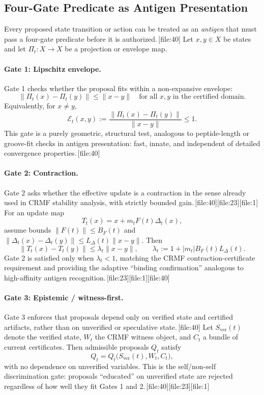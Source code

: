 \documentclass[11pt]{article}
\begin{document}
\subsection*{Four-Gate Predicate as Antigen Presentation}

Every proposed state transition or action can be treated as an \emph{antigen} that must pass a four-gate predicate before it is authorized.\,[file:40]
Let \(x,y\in X\) be states and let \(\Pi_t:X\to X\) be a projection or envelope map.

\paragraph{Gate 1: Lipschitz envelope.}

Gate 1 checks whether the proposal fits within a non-expansive envelope:
\[
\|\Pi_t(x)-\Pi_t(y)\| \le \|x-y\|\quad\text{for all }x,y\text{ in the certified domain.}
\]
Equivalently, for \(x\ne y\),
\[
\mathcal{E}_t(x,y) := \frac{\|\Pi_t(x)-\Pi_t(y)\|}{\|x-y\|} \le 1.
\]
This gate is a purely geometric, structural test, analogous to peptide-length or groove-fit checks in antigen presentation: fast, innate, and independent of detailed convergence properties.\,[file:40]

\paragraph{Gate 2: Contraction.}

Gate 2 asks whether the effective update is a contraction in the sense already used in CRMF stability analysis, with strictly bounded gain.\,[file:40][file:23][file:1]
For an update map
\[
T_t(x) = x + m_t F(t)\Delta_t(x),
\]
assume bounds \(\|F(t)\|\le B_F(t)\) and \(\|\Delta_t(x)-\Delta_t(y)\|\le L_\Delta(t)\|x-y\|\).
Then
\[
\|T_t(x)-T_t(y)\| \le \lambda_t\|x-y\|,
\qquad
\lambda_t := 1 + |m_t|B_F(t)L_\Delta(t).
\]
Gate 2 is satisfied only when \(\lambda_t<1\), matching the CRMF contraction-certificate requirement and providing the adaptive “binding confirmation” analogous to high-affinity antigen recognition.\,[file:23][file:1][file:40]

\paragraph{Gate 3: Epistemic / witness-first.}

Gate 3 enforces that proposals depend only on verified state and certified artifacts, rather than on unverified or speculative state.\,[file:40]
Let \(S_{\mathrm{ver}}(t)\) denote the verified state, \(W_t\) the CRMF witness object, and \(C_t\) a bundle of current certificates.
Then admissible proposals \(Q_t\) satisfy
\[
Q_t = Q_t\big(S_{\mathrm{ver}}(t), W_t, C_t\big),
\]
with no dependence on unverified variables.
This is the self/non-self discrimination gate: proposals “educated” on unverified state are rejected regardless of how well they fit Gates 1 and 2.\,[file:40][file:23][file:1]
\end{document}
